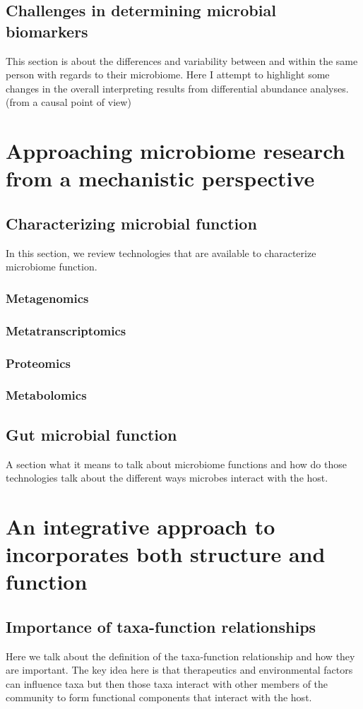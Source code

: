 \subsection{Challenges in determining microbial biomarkers}
This section is about the differences and variability between and within the same person with regards to their microbiome. Here I attempt to highlight some changes in the overall interpreting results from differential abundance analyses. (from a causal point of view)


\section{Approaching microbiome research from a mechanistic perspective}

\subsection{Characterizing microbial function}
In this section, we review technologies that are available to characterize microbiome function. 
\subsubsection{Metagenomics}
\subsubsection{Metatranscriptomics}
\subsubsection{Proteomics}
\subsubsection{Metabolomics}

\subsection{Gut microbial function}
A section what it means to talk about microbiome functions and how do those technologies talk about the different ways microbes interact with the host. 


\section{An integrative approach to incorporates both structure and function}

\subsection{Importance of taxa-function relationships}
Here we talk about the definition of the taxa-function relationship and how they are important. The key idea here is that therapeutics and environmental factors can influence taxa but then those taxa interact with other members of the community to form functional components that interact with the host. 


